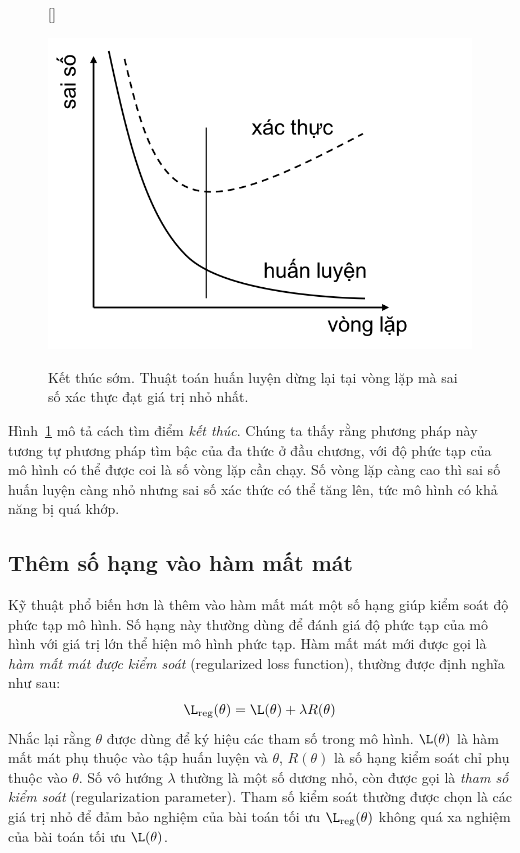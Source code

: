 \begin{figure}[t]
    [\FBwidth]
    {\caption{ 
    Kết thúc sớm. Thuật toán
    huấn luyện dừng lại tại vòng lặp mà sai số xác thực đạt giá trị nhỏ nhất. }
    \label{fig:15_earlystopping}}
    { %
    \includegraphics[width=.5\textwidth]{Chapters/01_Overview/15_overfitting/earlystopping_1.png}
    }
\end{figure}


Hình~\ref{fig:15_earlystopping} mô tả cách tìm điểm \textit{kết thúc}. Chúng ta
thấy rằng phương pháp này tương tự phương pháp tìm bậc của đa thức ở đầu chương,
với độ phức tạp của mô hình có thể được coi là số vòng lặp cần chạy. Số vòng lặp
càng cao thì sai số huấn luyện càng nhỏ nhưng sai số xác thức có thể tăng lên, tức mô hình có khả năng bị quá khớp.
 
 
\subsection{Thêm số hạng vào hàm mất mát}
Kỹ thuật phổ biến hơn là thêm vào hàm mất mát một số hạng giúp
kiểm soát độ phức tạp mô hình. Số hạng này thường dùng để đánh giá độ phức tạp của
mô hình với giá trị lớn thể hiện mô hình phức tạp. {Hàm mất mát mới} được
gọi là \textit{hàm mất mát được kiểm soát} (regularized loss function), thường được định nghĩa như sau:
\begin{equation*} 
\L_{\text{reg}}(\theta) = \L(\theta) + \lambda R(\theta) 
\end{equation*} 
Nhắc lại rằng $\theta$ được dùng để ký hiệu các tham số trong mô hình. $\L(\theta)$ là hàm mất mát phụ thuộc vào tập huấn luyện và $\theta$, $R(\theta)$ là số hạng kiểm soát chỉ phụ thuộc vào $\theta$. Số vô hướng $\lambda$ thường là một số dương nhỏ, còn được gọi là \textit{tham số kiểm soát} (regularization parameter).
Tham số kiểm soát thường được chọn là các giá trị nhỏ để đảm bảo nghiệm
của bài toán tối ưu $\L_{\text{reg}}(\theta)$ không quá xa nghiệm của bài toán
tối ưu $\L(\theta)$. 

